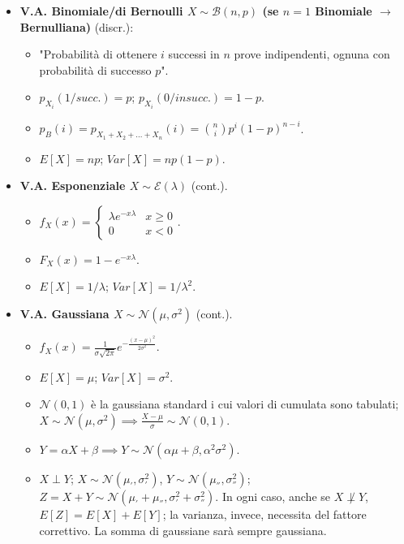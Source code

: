 \documentclass[8pt]{extarticle}
\begin{document}
\begin{multicols*}{3}
\begin{itemize}
        \item \textbf{V.A. Binomiale/di Bernoulli $X\sim\mathcal{B}(n,p)$ (se $n=1$ Binomiale $\rightarrow$ Bernulliana)} (discr.):
              \begin{itemize}
                  \item "Probabilità di ottenere $i$ successi in $n$ prove indipendenti, ognuna con probabilità di successo $p$".
                  \item $p_{X_{i}}(1/succ.)=p$; $p_{X_{i}}(0/insucc.)=1-p$.
                  \item $p_{B}(i)=p_{X_{1}+X_{2}+...+X_{n}}(i)=\binom{n}{i}p^{i}(1-p)^{n-i}$.
                  \item $E[X]=np$; $Var[X]=np(1-p)$.
              \end{itemize}
        \item \textbf{V.A. Esponenziale $X\sim\mathcal{E}(\lambda)$} (cont.).
              \begin{itemize}
                  \item $f_{X}(x)=\begin{cases}
                                \lambda e^{-x\lambda} & x\geq 0 \\
                                0                     & x<0
                            \end{cases}$.
                  \item $F_{X}(x)=1-e^{-x\lambda}$.
                  \item $E[X]=1/\lambda$; $Var[X]=1/\lambda^{2}$.
              \end{itemize}
        \item \textbf{V.A. Gaussiana $X\sim\mathcal{N}(\mu,\sigma^{2})$} (cont.).
              \begin{itemize}
                  \item $f_{X}(x)=\frac{1}{\sigma\sqrt{2\pi}}e^{-\frac{(x-\mu)^{2}}{2\sigma^{2}}}$.
                  \item $E[X]=\mu$; $Var[X]=\sigma^{2}$.
                  \item $\mathcal{N}(0,1)$ è la gaussiana standard i cui valori di cumulata sono tabulati; $X\sim\mathcal{N}(\mu, \sigma^{2})\implies \frac{X-\mu}{\sigma}\sim\mathcal{N}(0,1)$.
                  \item $Y=\alpha X+\beta\implies Y\sim\mathcal{N}(\alpha\mu +\beta,\alpha^{2}\sigma^{2})$.
                  \item $X\perp Y$; $X\sim\mathcal{N}(\mu_{'}, \sigma_{'}^{2})$, $Y\sim\mathcal{N}(\mu_{''}, \sigma_{''}^{2})$; $Z=X+Y\sim\mathcal{N}(\mu_{'}+\mu_{''}, \sigma_{'}^{2}+\sigma_{''}^{2})$. In ogni caso, anche se $X\not\perp Y$, $E[Z]=E[X]+E[Y]$; la varianza, invece, necessita del fattore correttivo. La somma di gaussiane sarà sempre gaussiana.
              \end{itemize}
    \end{itemize}

\end{multicols*}
\end{document}
